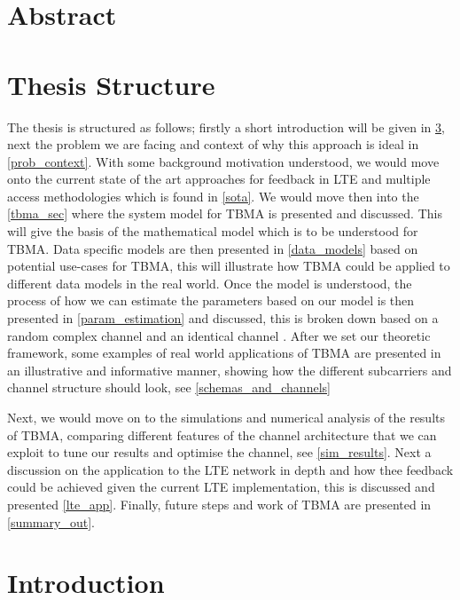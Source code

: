\documentclass{article}
\begin{document}
\section{Abstract}

\section{Thesis Structure}
The thesis is structured as follows; firstly a short introduction will be given in \cref{intro}, next the problem we are facing and context of why this approach is ideal in \cref{prob_context}. With some background motivation understood, we would move onto the current state of the art approaches for feedback in LTE and multiple access methodologies which is found in \cref{sota}. We would move then into the \cref{tbma_sec} where the system model for TBMA is presented and discussed. This will give the basis of the mathematical model which is to be understood for TBMA. Data specific models are then presented in \cref{data_models} based on potential use-cases for TBMA, this will illustrate how TBMA could be applied to different data models in the real world. Once the model is understood, the process of how we can estimate the parameters based on our model is then presented in \cref{param_estimation} and discussed, this is broken down based on a random complex channel and an identical channel \cite{tbma}. After we set our theoretic framework, some examples of real world applications of TBMA are presented in an illustrative and informative manner, showing how the different subcarriers and channel structure should look, see \cref{schemas_and_channels}

Next, we would move on to the simulations and numerical analysis of the results of TBMA, comparing different features of the channel architecture that we can exploit to tune our results and optimise the channel, see \cref{sim_results}. Next a discussion on the application to the LTE network in depth and how thee feedback could be achieved given the current LTE implementation, this is discussed and presented \cref{lte_app}. Finally, future steps and work of TBMA are presented in \cref{summary_out}. 

\section{Introduction}\label{intro}
\end{document}
